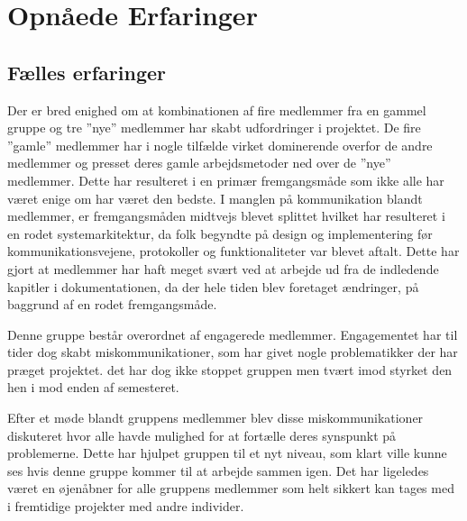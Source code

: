 \chapter{Opnåede Erfaringer}
\section{Fælles erfaringer}
Der er bred enighed om at kombinationen af fire medlemmer fra en gammel gruppe og tre ''nye'' medlemmer har skabt udfordringer i projektet. De fire ''gamle'' medlemmer har i nogle tilfælde virket dominerende overfor de andre medlemmer og presset deres gamle arbejdsmetoder ned over de ''nye'' medlemmer. Dette har resulteret i en primær fremgangsmåde som ikke alle har været enige om har været den bedste. I manglen på kommunikation blandt medlemmer, er fremgangsmåden midtvejs blevet splittet hvilket har resulteret i en rodet systemarkitektur, da folk begyndte på design og implementering før kommunikationsvejene, protokoller og funktionaliteter var blevet aftalt. Dette har gjort at medlemmer har haft meget svært ved at arbejde ud fra de indledende kapitler i dokumentationen, da der hele tiden blev foretaget ændringer, på baggrund af en rodet fremgangsmåde.

Denne gruppe består overordnet af engagerede medlemmer. Engagementet har til tider dog skabt miskommunikationer, som har givet nogle problematikker der har præget projektet. det har dog ikke stoppet gruppen men tvært imod styrket den hen i mod enden af semesteret.

Efter et møde blandt gruppens medlemmer blev disse miskommunikationer diskuteret hvor alle havde mulighed for at fortælle deres synspunkt på problemerne. Dette har hjulpet gruppen til et nyt niveau, som klart ville kunne ses hvis denne gruppe kommer til at arbejde sammen igen. Det har ligeledes været en øjenåbner for alle gruppens medlemmer som helt sikkert kan tages med i fremtidige projekter med andre individer.









\clearpage